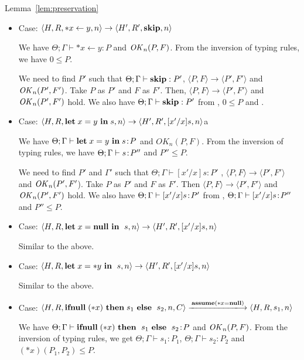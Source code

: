 \begin{pfof}{Lemma~\ref{lem:preservation}}
\begin{itemize}
\item Case: \( \langle H, R, *x \leftarrow y , n \rangle \rightarrow
  \langle H', R', \mathbf{skip}, n \rangle \)

  We have \(\Theta; \Gamma \vdash *x \leftarrow y : P\) and
  \(\mathit{OK}_{n}(P, F)\). From the inversion of typing rules, we have \(0 \le
  P\).

  We need to find \(P'\) such that \(\Theta; \Gamma \vdash \mathbf{skip}:
  P'\), \( \langle P, F \rangle \rightarrow \langle P', F'
  \rangle \) and \(\mathit{OK}_n(P', F')\). Take \(P\) as \(P'\) and \(F\) as
  \(F'\). Then, \( \langle P, F\rangle \rightarrow \langle P',
  F'\rangle\) and \(\mathit{OK}_n(P', F')\) hold. We also have \(\Theta;
  \Gamma \vdash \mathbf{skip}: P'\) from , \(0 \le P\) and
  .

\item Case: \( \langle H, R, \mathbf{let}\; x = y\ \mathbf{in}\; s , n \rangle
  \rightarrow \langle H', R', [x'/x]s, n \rangle \)a

  We have \(\Theta; \Gamma \vdash \LET x = y \ \IN s \COL P\) and
  \(OK_{n}(P, F)\). From the inversion of typing rules, we have \(\Theta;
  \Gamma \vdash s\!:\! P''\) and \(P'' \le P\).

  We need to find \(P'\) and \(\Gamma'\) such that \(\Theta; \Gamma
  \vdash [x'/x]s : P'\) , \( \langle P, F \rangle \rightarrow \langle
  P', F' \rangle\) and \(\mathit{OK}_n(P', F'\)). Take \(P\) as \(P'\) and
  \(F\) as \(F'\). Then \( \langle P,F \rangle \rightarrow \langle P',
  F' \rangle\) and \(\mathit{OK}_n(P', F')\) hold.  We also have \(\Theta;
  \Gamma \vdash [x'/x]s\!:\! P'\) from , \(\Theta; \Gamma
  \vdash [x'/x]s\!:\! P''\) and \( P'' \le P\).

\item Case: \( \langle H, R, \LET x = \NULL \ \IN \ s, n\rangle
  \rightarrow \langle H', R', [x'/x]s, n \rangle \)

  Similar to the above.

\item Case: \( \langle H, R, \mathbf{let}\; x = *y \ \mathbf{in}\; \ s, n\rangle
  \rightarrow \langle H', R', [x'/x]s, n\rangle \)

  Similar to the above.

\item Case: \(\langle H, R, \IFNULL \Sirx \ \THEN s_{1} \ \ELSE
  \ s_{2}, n, C\rangle \xlongrightarrow{\sassx} \langle H, R, s_{1}, n \rangle\)

  We have \(\Theta; \Gamma \vdash \mathbf{ifnull}\; (*x) \ \mathbf{then}\; \ s_{1}
  \ \mathbf{else}\; \ s_{2}\!:\! P\) and \(\mathit{OK}_{n}(P, F)\). From the inversion of
  typing rules, we get \(\Theta; \Gamma \vdash s_1 : P_1\),
  \(\Theta; \Gamma \vdash s_2 : P_2\) and \( (*x)(P_1,P_2) \le
  P\). 


\end{itemize}
\end{pfof}
